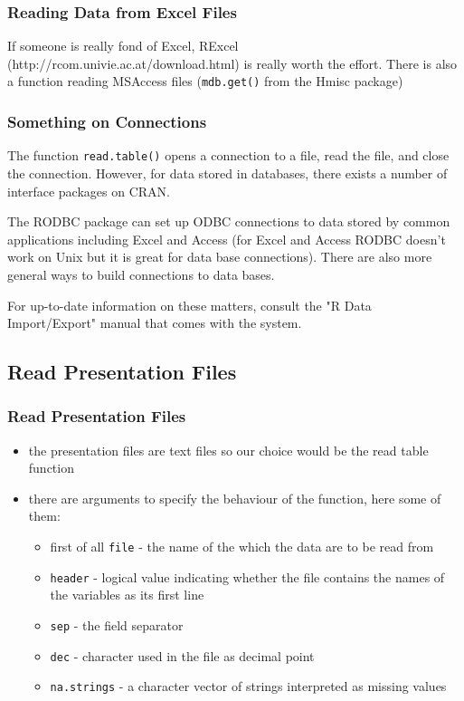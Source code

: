 \documentclass[xcolor={table},c]{beamer}
\begin{document}
\begin{frame}[fragile]\frametitle{Reading Data from Excel Files}
If someone is really fond of Excel, RExcel (http://rcom.univie.ac.at/download.html) is really worth the effort. There is also a function reading MSAccess files (\texttt{mdb.get()} from the Hmisc package)
\end{frame}

\begin{frame}\frametitle{Something on Connections}
The function \texttt{read.table()} opens a connection to a file, read the file, and close the connection. However, for data stored in databases, there exists a number of interface packages on CRAN. 

The RODBC package can set up ODBC connections to data stored by common applications including Excel and Access (for Excel and Access RODBC doesn't work on Unix but it is great for data base connections). There are also more general ways to build connections to data bases.

For up-to-date information on these matters, consult the "R Data Import/Export" manual that comes with the system.
\end{frame}


\subsection{Read Presentation Files}
\begin{frame}\frametitle{Read Presentation Files}
  \begin{itemize}
  \item the presentation files are text files so our choice would be the read table function
  \item there are arguments to specify the behaviour of the function, here some of them:
    \begin{itemize}
    \item first of all \texttt{file} - the name of the which the data are to be read from
    \item \texttt{header} - logical value indicating whether the file contains the names of the variables as its first line
    \item \texttt{sep} - the field separator
    \item \texttt{dec} - character used in the file as decimal point
    \item \texttt{na.strings} - a character vector of strings interpreted as missing values
    \end{itemize}
  \end{itemize}
\end{frame}
\end{document}
